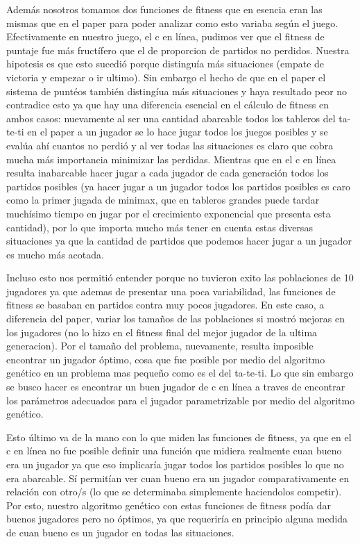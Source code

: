 \documentclass[A4paper,oneside,fleqn,11pt]{article}
\theoremstyle{definition}
\begin{document}
Además nosotros tomamos dos funciones de fitness que en esencia eran las mismas que en el paper para poder analizar como esto variaba según el juego. Efectivamente en nuestro juego, el c en línea, pudimos ver que el fitness de puntaje fue más fructífero que el de proporcion de partidos no perdidos. Nuestra hipotesis es que esto sucedió porque distinguía más situaciones (empate de victoria y empezar o ir ultimo). Sin embargo el hecho de que en el paper el sistema de puntéos también distingíua más situaciones y haya resultado peor no contradice esto ya que hay una diferencia esencial en el cálculo de fitness en ambos casos: nuevamente al ser una cantidad abarcable todos los tableros del ta-te-ti en el paper a un jugador se lo hace jugar todos los juegos posibles y se evalúa ahí cuantos no perdió y al ver todas las situaciones es claro que cobra mucha más importancia minimizar las perdidas. Mientras que en el c en línea resulta inabarcable hacer jugar a cada jugador de cada generación todos los partidos posibles (ya hacer jugar a un jugador todos los partidos posibles es caro como la primer jugada de minimax, que en tableros grandes puede tardar muchísimo tiempo en jugar por el crecimiento exponencial que presenta esta cantidad), por lo que importa mucho más tener en cuenta estas diversas situaciones ya que la cantidad de partidos que podemos hacer jugar a un jugador es mucho más acotada.

Incluso esto nos permitió entender porque no tuvieron exito las poblaciones de 10 jugadores ya que ademas de presentar una poca variabilidad, las funciones de fitness se basaban en partidos contra muy pocos jugadores. En este caso, a diferencia del paper, variar los tamaños de las poblaciones si mostró mejoras en los jugadores (no lo hizo en el fitness final del mejor jugador de la ultima generacion). Por el tamaño del problema, nuevamente, resulta imposible encontrar un jugador óptimo, cosa que fue posible por medio del algoritmo genético en un problema mas pequeño como es el del ta-te-ti. Lo que sin embargo se busco hacer es encontrar un buen jugador de c en línea a traves de encontrar los parámetros adecuados para el jugador parametrizable por medio del algoritmo genético.

Esto último va de la mano con lo que miden las funciones de fitness, ya que en el c en línea no fue posible definir una función que midiera realmente cuan bueno era un jugador ya que eso implicaría jugar todos los partidos posibles lo que no era abarcable. Sí permitían ver cuan bueno era un jugador comparativamente en relación con otro/s (lo que se determinaba simplemente haciendolos competir). Por esto, nuestro algoritmo genético con estas funciones de fitness podía dar buenos jugadores pero no óptimos, ya que requeriría en principio alguna medida de cuan bueno es un jugador en todas las situaciones.
\end{document}
